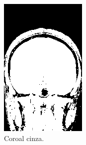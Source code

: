 \documentclass{article}
\begin{document}
\begin{figure}[h]
\begin{subfigure}[b]{0.3\textwidth}
        \includegraphics[width=\textwidth]{brain/radiologist-coronal-gray.png}
        \caption{Coroal cinza.}
    \end{subfigure}
    ~
    \begin{subfigure}[b]{0.3\textwidth}

\end{subfigure}
\end{figure}
\end{document}
